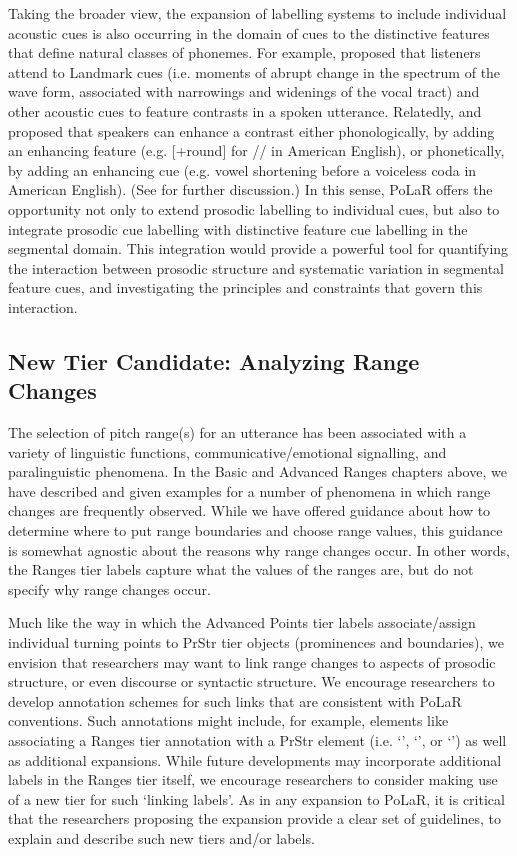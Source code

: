 \documentclass[11pt, twoside]{memoir}
\def\polar#1{{\relsize{-.5}\fontspec[Mapping=tex-text]{Roboto Mono}{#1}}}
\def\polarquot#1{‘\polar{#1}’}
\def\ipatext#1{{\fontspec[Mapping=tex-text, Ligatures=NoCommon]{Cambria}{#1}}}
\def\ipaslashes#1{/\ipatext{#1}/}
\begin{document}
Taking the broader view,  the expansion of labelling systems to include individual acoustic cues is also occurring in the domain of cues to the distinctive features that define natural classes of phonemes.  For example, \citet{stevens02} proposed that listeners attend to Landmark cues (i.e. moments of abrupt change in the spectrum of the wave form, associated with narrowings and widenings of the vocal tract) and other acoustic cues to feature contrasts in a spoken utterance.  Relatedly, \citet{stevenskeyser89} and \citet{keyserstevens01} proposed that speakers can enhance a contrast either phonologically, by adding an enhancing feature (e.g. [+round] for \ipaslashes{ʃ} in American English), or phonetically, by adding an enhancing cue (e.g. vowel shortening before a voiceless coda in American English).  (See \citealt{clements09} for further discussion.)   In this sense, PoLaR offers the opportunity not only to extend prosodic labelling to individual cues, but also to integrate prosodic cue labelling with distinctive feature cue labelling in the segmental domain.  This integration would provide a powerful tool for quantifying the interaction between prosodic structure and systematic variation in segmental feature cues, and investigating the principles and constraints that govern this interaction.  

\subsection{New Tier Candidate: Analyzing Range Changes}\label{sec:new-tier-range-changes}
The selection of pitch range(s) for an utterance has been associated with a variety of linguistic functions, communicative\slash emotional signalling, and paralinguistic phenomena. In the Basic and Advanced Ranges chapters above, we have described and given examples for a number of phenomena in which range changes are frequently observed.  While we have offered guidance about how to determine where to put range boundaries and choose range values, this guidance is somewhat agnostic about the reasons why range changes occur. In other words, the Ranges tier labels capture what the values of the ranges are, but do not specify why range changes occur. 

Much like the way in which the Advanced Points tier labels associate\slash assign individual turning points to PrStr tier objects (prominences and boundaries), we envision that researchers may want to link range changes to aspects of prosodic structure, or even discourse or syntactic structure. We encourage researchers to develop annotation schemes for such links that are consistent with PoLaR conventions. Such annotations might include, for example, elements like associating a Ranges tier annotation with a PrStr element (i.e. \polarquot{*}, \polarquot{[}, or \polarquot{]}) as well as additional expansions. While future developments may incorporate additional labels in the Ranges tier itself, we encourage researchers to consider making use of a new tier for such ‘linking labels’. As in any expansion to PoLaR, it is critical that the researchers proposing the expansion provide a clear set of guidelines, to explain and describe such new tiers and/or labels.
\end{document}
